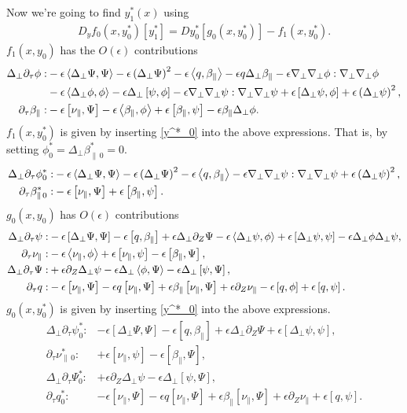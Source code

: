 \documentclass{article}
\newcommand{\para}{\parallel}
\newcommand{\ep}{\epsilon}
\newcommand{\np}{\nabla_\perp}
\newcommand{\lap}{\Delta_\perp}
\newcommand{\p}{\partial}
\newcommand{\pth} [1] {\left( #1 \right) }
\newcommand{\br} [1] {\left[ #1 \right] }
\begin{document}
Now we're going to find $y^*_1(x)$ using 
\begin{align*}
    D_yf_0(x,y_0^*)[y^*_1] = Dy^*_0[g_0\pth{x,y_0^*}] - f_1(x,y_0^*).
\end{align*}
$f_1(x,y_0)$ has the $O(\ep)$ contributions
\begin{align*}
    \lap\p_\tau\phi: &- \ep\Braket{\lap\Psi, \Psi} - \ep\pth{\lap\Psi}^2 - \ep\Braket{q,\beta_\para} - \ep q\lap\beta_\para - \ep\np\np\phi:\np\np\phi \\
    &- \ep\Braket{\lap\phi, \phi} - \ep\lap\br{\psi,\phi} - \ep\np\np\psi:\np\np\psi + \ep\br{\lap\psi, \phi} + \ep\pth{\lap\psi}^2, \\
    \p_\tau\beta_\para: &-\ep\br{\nu_\para, \Psi} - \ep\Braket{\beta_\para, \phi} + \ep\br{\beta_\para, \psi} - \ep\beta_\para\lap\phi.
\end{align*}
$f_1\pth{x,y_0^*}$ is given by inserting \eqref{y^*_0} into the above expressions. That is, by setting $\phi_0^* = \lap\beta_{\para\,0}^* = 0$.
\begin{align*}
    \lap\p_\tau\phi_0^*: &- \ep\Braket{\lap\Psi, \Psi} - \ep\pth{\lap\Psi}^2 - \ep\Braket{q,\beta_\para} - \ep\np\np\psi:\np\np\psi + \ep\pth{\lap\psi}^2, \\
    \p_\tau\beta_{\para\,0}^*: &-\ep\br{\nu_\para, \Psi} + \ep\br{\beta_\para, \psi}.
\end{align*}
$g_0(x,y_0)$ has $O(\ep)$ contributions
\begin{align*}
    \lap\p_\tau\psi: &- \ep\br{\lap\Psi, \Psi} - \ep\br{q, \beta_\para} + \ep\lap\p_Z\Psi - \ep\Braket{\lap\psi, \phi} + \ep\br{\lap\psi, \psi} - \ep\lap\phi\lap\psi, \\
    \p_\tau\nu_\para: &- \ep\Braket{\nu_\para, \phi} + \ep\br{\nu_\para, \psi} - \ep\br{\beta_\para, \Psi}, \\
    \lap\p_\tau\Psi: &+ \ep\p_Z\lap\psi - \ep\lap\Braket{\phi, \Psi} - \ep\lap\br{\psi, \Psi}, \\
    \p_\tau q: &- \ep\br{\nu_\para, \Psi} - \ep q\br{\nu_\para, \Psi} + \ep\beta_\para\br{\nu_\para, \Psi} + \ep\p_Z\nu_\para - \ep\br{q, \phi} + \ep\br{q, \psi}.
\end{align*}
$g_0(x,y^*_0)$ is given by inserting \eqref{y^*_0} into the above expressions.
\begin{align*}
    \lap\p_\tau\psi_0^*: &- \ep\br{\lap\Psi, \Psi} - \ep\br{q, \beta_\para} + \ep\lap\p_Z\Psi + \ep\br{\lap\psi, \psi}, \\
    \p_\tau\nu_{\para\,0}^*: &+ \ep\br{\nu_\para, \psi} - \ep\br{\beta_\para, \Psi}, \\
    \lap\p_\tau\Psi_0^*: &+ \ep\p_Z\lap\psi - \ep\lap\br{\psi, \Psi}, \\
    \p_\tau q_0^*: &- \ep\br{\nu_\para, \Psi} - \ep q\br{\nu_\para, \Psi} + \ep\beta_\para\br{\nu_\para, \Psi} + \ep\p_Z\nu_\para + \ep\br{q, \psi}.
\end{align*}
\end{document}
